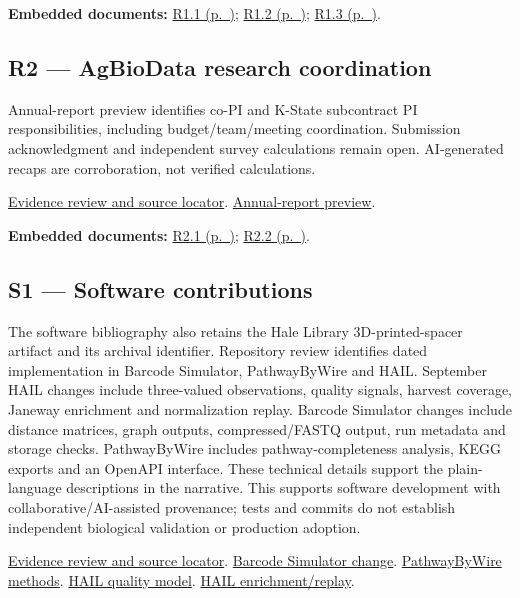 \par\medskip\noindent\textbf{Embedded documents:} \hyperref[supplement-R1.1]{R1.1 (p.~\pageref{supplement-R1.1})}; \hyperref[supplement-R1.2]{R1.2 (p.~\pageref{supplement-R1.2})}; \hyperref[supplement-R1.3]{R1.3 (p.~\pageref{supplement-R1.3})}.

\hypertarget{evidence-R2}{}
\subsection{R2 --- AgBioData research coordination}
Annual-report preview identifies co-PI and K-State subcontract PI responsibilities, including budget/team/meeting coordination. Submission acknowledgment and independent survey calculations remain open. AI-generated recaps are corroboration, not verified calculations.

\href{https://github.com/molikd/Molik-Tenure-Document/issues/4#issuecomment-5682646028}{Evidence review and source locator}.
\href{https://github.com/user-attachments/files/32247823/AgBioDataAnnualReport2026.pdf}{Annual-report preview}.

\par\medskip\noindent\textbf{Embedded documents:} \hyperref[supplement-R2.1]{R2.1 (p.~\pageref{supplement-R2.1})}; \hyperref[supplement-R2.2]{R2.2 (p.~\pageref{supplement-R2.2})}.

\hypertarget{evidence-S1}{}
\subsection{S1 --- Software contributions}
The software bibliography also retains the Hale Library 3D-printed-spacer artifact and its archival identifier. Repository review identifies dated implementation in Barcode Simulator, PathwayByWire and HAIL. September HAIL changes include three-valued observations, quality signals, harvest coverage, Janeway enrichment and normalization replay. Barcode Simulator changes include distance matrices, graph outputs, compressed/FASTQ output, run metadata and storage checks. PathwayByWire includes pathway-completeness analysis, KEGG exports and an OpenAPI interface. These technical details support the plain-language descriptions in the narrative. This supports software development with collaborative/AI-assisted provenance; tests and commits do not establish independent biological validation or production adoption.

\href{https://github.com/molikd/Molik-Tenure-Document/issues/4#issuecomment-5683940839}{Evidence review and source locator}.
\href{https://github.com/molikd/Barcode_Simulator/commit/9cff9780bc2cf6db332a2edf0765203c4aaf8ddd}{Barcode Simulator change}.
\href{https://github.com/molikd/PathwayByWire/pull/4}{PathwayByWire methods}.
\href{https://github.com/molikd/hail/pull/33}{HAIL quality model}.
\href{https://github.com/molikd/hail/pull/34}{HAIL enrichment/replay}.

